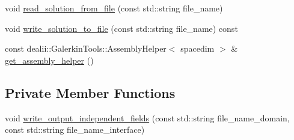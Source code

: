 \begin{DoxyCompactItemize}
\item 
void \hyperlink{classincremental_f_e_1_1_f_e_model_a8a620d159ca26e9171bdb840bb306f14}{read\+\_\+solution\+\_\+from\+\_\+file} (const std\+::string file\+\_\+name)
\item 
void \hyperlink{classincremental_f_e_1_1_f_e_model_adcc8cc23c6c86f49a7f03b72854c1f80}{write\+\_\+solution\+\_\+to\+\_\+file} (const std\+::string file\+\_\+name) const 
\item 
const dealii\+::\+Galerkin\+Tools\+::\+Assembly\+Helper$<$ spacedim $>$ \& \hyperlink{classincremental_f_e_1_1_f_e_model_af729211245ada354c157f3f1677b5067}{get\+\_\+assembly\+\_\+helper} ()
\end{DoxyCompactItemize}
\subsection*{Private Member Functions}
\begin{DoxyCompactItemize}
\item 
void \hyperlink{classincremental_f_e_1_1_f_e_model_a0a3607e99a9a31086cb12b426a50149b}{write\+\_\+output\+\_\+independent\+\_\+fields} (const std\+::string file\+\_\+name\+\_\+domain, const std\+::string file\+\_\+name\+\_\+interface)
\end{DoxyCompactItemize}
